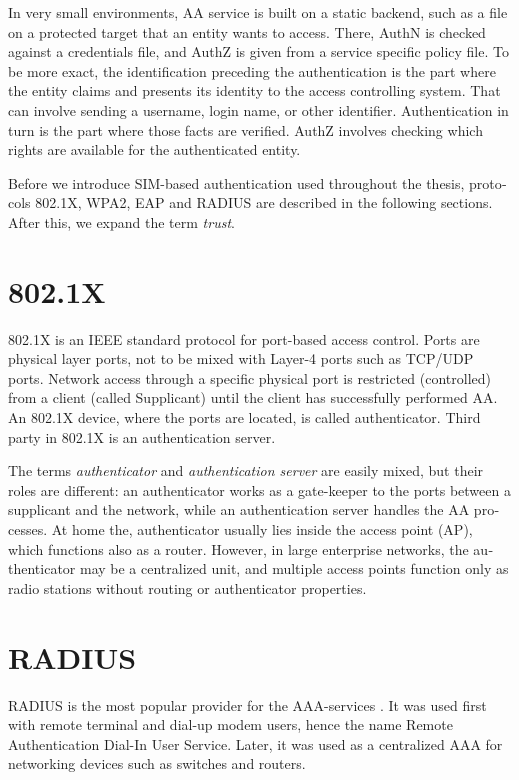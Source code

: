 \documentclass[12pt,a4paper,english]{tutthesis}
\begin{document}
\begin{otherlanguage}{english}
In very small environments, AA service is built on a static backend, such
as a file on a protected target that an entity wants to access. There, AuthN
is checked against a credentials file, and AuthZ is given from a service
specific policy file. 
To be more exact, the identification preceding the authentication is the part
where the entity claims and presents its identity to the 
access controlling system. That can involve sending a username, login
name, or other identifier. Authentication in turn is the part where
those facts are verified. AuthZ involves checking which rights are 
available for the authenticated entity. 


Before we introduce SIM-based authentication used throughout the
thesis, protocols 802.1X, WPA2, EAP and RADIUS are described in the
following sections. After this, we expand the term \emph{trust}.

\section{802.1X}
\label{sec-2-1}

802.1X \cite{8021X} is an IEEE standard protocol for port-based access
control. Ports are physical layer ports, not to be mixed with Layer-4 ports such as TCP/UDP ports.
 Network access through a specific physical port is
restricted (controlled) from a client (called Supplicant) until
the client has successfully performed AA. An 802.1X device, where
the ports are located, is called  authenticator. Third party in 802.1X is an
authentication server. 



The terms \emph{authenticator} and \emph{authentication server} are easily
mixed, but their roles are different: an authenticator works as a
gate-keeper to the ports between a supplicant and the network, while
an authentication server handles the AA processes.
At home the, authenticator usually lies inside the access point (AP),
which functions also as a router. However, in large enterprise
networks, the authenticator may be a centralized unit, 
and multiple access points function only as radio stations without
routing or authenticator properties.



\section{RADIUS}
\label{sec-2-2}
\label{sec:radius}
RADIUS is the most popular provider for the 
AAA-services \cite[p.75]{radius-popular}.  It was used first with remote terminal
and dial-up modem users, hence the name Remote Authentication Dial-In
User Service. Later, it was used as a centralized AAA for networking
devices such as switches and routers.  











\end{otherlanguage}
\end{document}
